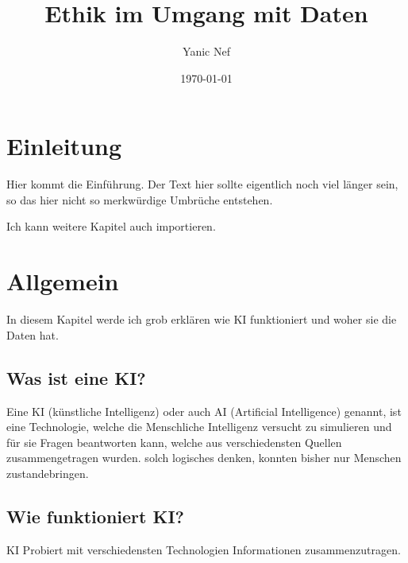 \documentclass{report}
\title{Ethik im Umgang mit Daten}
\author{Yanic Nef}
\date{\today}
\begin{document}
\maketitle


\tableofcontents

\chapter{Einleitung}

Hier kommt die Einführung. Der Text hier sollte eigentlich noch viel länger sein, so das hier nicht so merkwürdige Umbrüche entstehen.

Ich kann weitere Kapitel auch importieren.

\chapter{Allgemein}
\label{chap:allgemein}

In diesem Kapitel werde ich grob erklären wie KI funktioniert und woher sie die Daten hat.

\section{Was ist eine KI?}

Eine KI (künstliche Intelligenz) oder auch AI (Artificial Intelligence) genannt, ist eine Technologie, welche die Menschliche Intelligenz versucht zu simulieren und für sie Fragen beantworten kann, welche aus verschiedensten Quellen zusammengetragen wurden. solch logisches denken, konnten bisher nur Menschen zustandebringen.

\section{Wie funktioniert KI?}

KI Probiert mit verschiedensten Technologien Informationen zusammenzutragen.


\printbibliography
\end{document}
